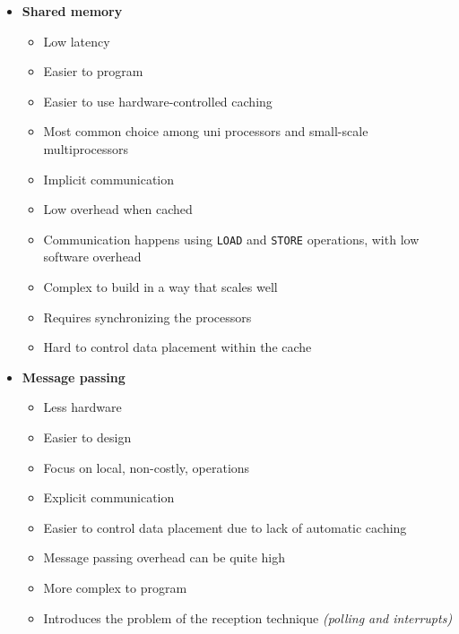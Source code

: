 \documentclass[english]{article}
\begin{document}
\begin{minipage}{0.99\textwidth}
  \bigskip
  \begin{itemize}
    \item \textbf{Shared memory}
          \begin{itemize}[label=\cmarkthin]
            \item Low latency
            \item Easier to program
            \item Easier to use hardware-controlled caching
            \item Most common choice among uni processors and small-scale multiprocessors
            \item Implicit communication
            \item Low overhead when cached
            \item Communication happens using \texttt{LOAD} and \texttt{STORE} operations, with low software overhead
          \end{itemize}
          \begin{itemize}[label=\xmarkthin]
            \item Complex to build in a way that scales well
            \item Requires synchronizing the processors
            \item Hard to control data placement within the cache
          \end{itemize}
    \item \textbf{Message passing}
          \begin{itemize}[label=\cmarkthin]
            \item Less hardware
            \item Easier to design
            \item Focus on local, non-costly, operations
            \item Explicit communication
            \item Easier to control data placement due to lack of automatic caching
          \end{itemize}
          \begin{itemize}[label=\xmarkthin]
            \item Message passing overhead can be quite high
            \item More complex to program
            \item Introduces the problem of the reception technique \textit{(polling and interrupts)}
          \end{itemize}
  \end{itemize}
  \bigskip
\end{minipage}
\end{document}
